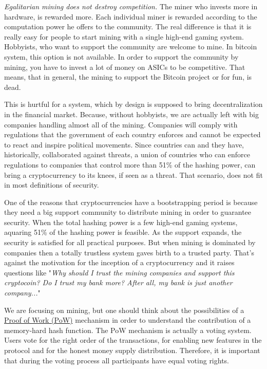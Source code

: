 \emph{Egalitarian mining does not destroy competition.} The miner who invests more in hardware, is rewarded more. Each individual miner is rewarded according to the computation power he offers to the community. The real difference is that it is really easy for people to start mining with a single high-end gaming system. Hobbyists, who want to support the community are welcome to mine. In bitcoin system, this option is not available. In order to support the community by mining, you have to invest a lot of money on ASICs to be competitive. That means, that in general, the mining to support the Bitcoin project or for fun, is dead.

This is hurtful for a system, which by design is supposed to bring decentralization in the financial market. Because, without hobbyists, we are actually left with big companies handling almost all of the mining. Companies will comply with regulations that the government of each country enforces and cannot be expected to react and inspire political movements. Since countries can and they have, historically, collaborated against threats, a union of countries who can enforce regulations to companies that control more than 51\% of the hashing power, can bring a cryptocurrency to its knees, if seen as a threat. That scenario, does not fit in most definitions of security.

One of the reasons that cryptocurrencies have a bootstrapping period is because they need a big support community to distribute mining in order to guarantee security. When the total hashing power is a few high-end gaming systems, aquaring 51\% of the hashing power is feasible. As the support expands, the security is satisfied for all practical purposes. But when mining is dominated by companies then a totally trustless system gaves birth to a trusted party. That's against the motivation for the inception of a cryptocurrency and it raises questions like "\emph{Why should I trust the mining companies and support this cryptocoin? Do I trust my bank more? After all, my bank is just another company...}"

We are focusing on mining, but one should think about the possibilities of a \hyperref[proofOfWork]{Proof of Work (PoW)} mechanism in order to understand the contribution of a memory-hard hash function. The PoW mechanism is actually a voting system. Users vote for the right order of the transactions, for enabling new features in the protocol and for the honest money supply distribution. Therefore, it is important that during the voting process all participants have equal voting rights.

